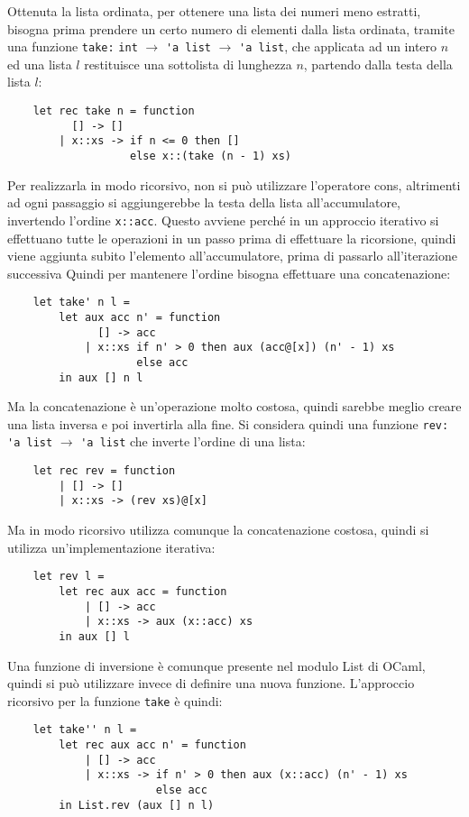 \documentclass{article}
\numberwithin{equation}{subsection}
\begin{document}
Ottenuta la lista ordinata, per ottenere una lista dei numeri meno estratti, bisogna prima prendere un certo numero di elementi dalla lista ordinata, tramite una funzione \verb|take:| \verb|int| $\rightarrow$ \verb|'a list| $\rightarrow$ \verb|'a list|, che applicata ad un intero $n$ ed una lista $l$ restituisce una sottolista di lunghezza $n$, partendo dalla testa della lista $l$:
\begin{verbatim}
    let rec take n = function
          [] -> []
        | x::xs -> if n <= 0 then []
                   else x::(take (n - 1) xs)
\end{verbatim}
Per realizzarla in modo ricorsivo, non si può utilizzare l'operatore cons, altrimenti ad ogni passaggio si aggiungerebbe la testa della lista all'accumulatore, invertendo l'ordine \verb|x::acc|. Questo avviene perché in un approccio iterativo si effettuano tutte le operazioni in un passo prima di effettuare la ricorsione, quindi viene aggiunta subito l'elemento all'accumulatore, prima di passarlo all'iterazione successiva Quindi per mantenere l'ordine bisogna effettuare una concatenazione:
\begin{verbatim}
    let take' n l = 
        let aux acc n' = function
              [] -> acc
            | x::xs if n' > 0 then aux (acc@[x]) (n' - 1) xs
                    else acc 
        in aux [] n l
\end{verbatim}
Ma la concatenazione è un'operazione molto costosa, quindi sarebbe meglio creare una lista inversa e poi invertirla alla fine. Si considera quindi una funzione \verb|rev: 'a list| $\rightarrow$ \verb|'a list| che inverte l'ordine di una lista:
\begin{verbatim}
    let rec rev = function
        | [] -> []
        | x::xs -> (rev xs)@[x]    
\end{verbatim}
Ma in modo ricorsivo utilizza comunque la concatenazione costosa, quindi si utilizza un'implementazione iterativa:
\begin{verbatim}
    let rev l =
        let rec aux acc = function
            | [] -> acc
            | x::xs -> aux (x::acc) xs
        in aux [] l
\end{verbatim}
Una funzione di inversione è comunque presente nel modulo List di OCaml, quindi si può utilizzare invece di definire una nuova funzione. L'approccio ricorsivo per la funzione \verb|take| è quindi:
\begin{verbatim}
    let take'' n l = 
        let rec aux acc n' = function
            | [] -> acc
            | x::xs -> if n' > 0 then aux (x::acc) (n' - 1) xs
                       else acc 
        in List.rev (aux [] n l)
\end{verbatim}
\end{document}
